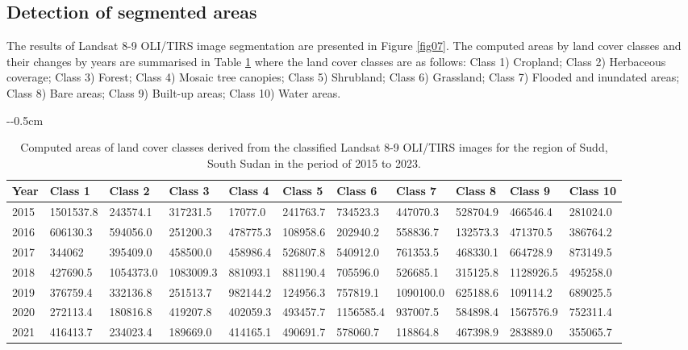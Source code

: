 \documentclass[analytics,article,submit,pdftex,moreauthors]{Definitions/mdpi}
\begin{document}
\subsection{Detection of segmented areas}

The results of Landsat 8-9 OLI/TIRS image segmentation are presented in Figure \ref{fig07}. The computed areas by land cover classes and their changes by years are summarised in Table \ref{tab02} where the land cover classes are as follows: Class 1) Cropland; Class 2) Herbaceous coverage; Class 3) Forest; Class 4) Mosaic tree canopies; Class 5) Shrubland; Class 6) Grassland; Class 7) Flooded and inundated areas; Class 8) Bare areas; Class 9) Built-up areas; Class 10) Water areas.

\begin{table}[H]
    \caption{Computed areas of land cover classes derived from the classified Landsat 8-9 OLI/TIRS images for the region of Sudd, South Sudan in the period of 2015 to 2023.\label{tab02}}
 \begin{adjustwidth}{-\extralength}{-0.5cm}
	\begin{tabularx}{\fulllength}{|l|l|l|l|l|l|l|l|l|l|l|}
    \toprule
        \textbf{Year} & \textbf{Class 1} & \textbf{Class 2} & \textbf{Class 3} & \textbf{Class 4} & \textbf{Class 5} & \textbf{Class 6} & \textbf{Class 7} & \textbf{Class 8} & \textbf{Class 9} & \textbf{Class 10} \\ \midrule
        2015 & 1501537.8 & 243574.1 & 317231.5 & 17077.0 & 241763.7 & 734523.3 & 447070.3 & 528704.9 & 466546.4 & 281024.0 \\ \hline
        2016 & 606130.3 & 594056.0 & 251200.3 & 478775.3 & 108958.6 & 202940.2 & 558836.7 & 132573.3 & 471370.5 & 386764.2 \\ \hline
        2017 & 344062 & 395409.0 & 458500.0 & 458986.4 & 526807.8 & 540912.0 & 761353.5 & 468330.1 & 664728.9 & 873149.5 \\ \hline
        2018 & 427690.5 & 1054373.0 & 1083009.3 & 881093.1 & 881190.4 & 705596.0 & 526685.1 & 315125.8 & 1128926.5 & 495258.0 \\ \hline
        2019 & 376759.4 & 332136.8 & 251513.7 & 982144.2 & 124956.3 & 757819.1 & 1090100.0 & 625188.6 & 109114.2 & 689025.5 \\ \hline
        2020 & 272113.4 & 180816.8 & 419207.8 & 402059.3 & 493457.7 & 1156585.4 & 937007.5 & 584898.4 & 1567576.9 & 752311.4 \\ \hline
        2021 & 416413.7 & 234023.4 & 189669.0 & 414165.1 & 490691.7 & 578060.7 & 118864.8 & 467398.9 & 283889.0 & 355065.7 \\ \hline

\end{tabularx}
\end{adjustwidth}
\end{table}
\end{document}
